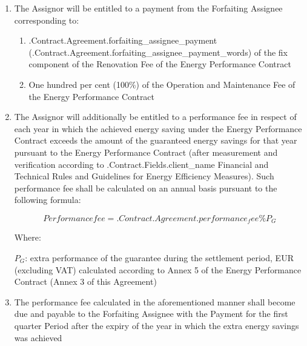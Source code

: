 \documentclass[a4paper]{article}
\begin{document}
\begin{enumerate}
\item{The Assignor will be entitled to a payment from the Forfaiting
    Assignee corresponding to:}

  \begin{enumerate}
  \item{ \iffalse input forfaitingFields.forfaiting_assignee_payment value="{{.Contract.Agreement.forfaiting_assignee_payment}}" type="number" \fi {{.Contract.Agreement.forfaiting_assignee_payment}} (\iffalse input forfaitingFields.forfaiting_assignee_payment_words value="{{.Contract.Agreement.forfaiting_assignee_payment_words}}" \fi {{.Contract.Agreement.forfaiting_assignee_payment_words}}) of the fix component of the Renovation
      Fee of the Energy Performance Contract}

  \item{One hundred per cent (100\%) of the Operation and Maintenance
      Fee of the Energy Performance Contract}
  \end{enumerate}

\item{The Assignor will additionally be entitled to a performance fee
    in respect of each year in which the achieved energy saving under
    the Energy Performance Contract exceeds the amount of the
    guaranteed energy savings for that year pursuant to the Energy
    Performance Contract (after measurement and verification according
    to {{.Contract.Fields.client_name}} Financial and Technical Rules and Guidelines for Energy
    Efficiency Measures). Such performance fee shall be calculated on
    an annual basis pursuant to the following formula: \par

    \begin{center}
      \[Performance fee = \iffalse input forfaitingFields.performance_fee value="{{.Contract.Agreement.performance_fee}}" type="number" \fi {{.Contract.Agreement.performance_fee}}\% P_G\]
    \end{center}

    Where: \par
    $P_G$: extra performance of the guarantee during the
    settlement period, EUR (excluding VAT) calculated according to
    Annex 5 of the Energy Performance Contract (Annex 3 of this
    Agreement)}

\item{The performance fee calculated in the aforementioned manner
    shall become due and payable to the Forfaiting Assignee with the
    Payment for the first quarter Period after the expiry of the year
    in which the extra energy savings was achieved}


\end{enumerate}
\end{document}
